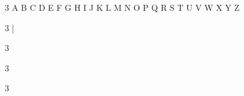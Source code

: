 \documentclass[12pt,twoside]{article}
\begin{document}

\begin{multicols}{3}
\charexample A
\charexample B
\charexample C
\charexample D
\charexample E
\charexample F
\charexample G
\charexample H
\charexample I
\charexample J
\charexample K
\charexample L
\charexample M
\charexample N
\charexample O
\charexample P
\charexample Q
\charexample R
\charexample S
\charexample T
\charexample U
\charexample V
\charexample W
\charexample X
\charexample Y
\charexample Z
\end{multicols}


\begin{multicols}{3}
\accentexample\acute
\accentexample\aacute
\accentexample\dot
\accentexample\ddot
\accentexample\grave
\accentexample\breve
\accentexample\hat
\accentexample\check
\accentexample\bar
\accentexample\mathring
\accentexample\tilde
\end{multicols}


\begin{multicols}{3}
\end{multicols}


\begin{multicols}{3}
\charexample\Alpha
\charexample\Beta
\charexample\Gamma
\charexample\Delta
\charexample\Epsilon
\charexample\Zeta
\charexample\Eta
\charexample\Theta
\charexample\Iota
\charexample\Kappa
\charexample\Lambda
\charexample\Mu
\charexample\Nu
\charexample\Xi
\charexample\Omicron
\charexample\Pi
\charexample\Rho
\charexample\Sigma
\charexample\Tau
\charexample\Upsilon
\charexample\Phi
\charexample\Chi
\charexample\Psi
\charexample\Omega
\charexample\varTheta
\charexample\increment
\charexample\nabla
\end{multicols}


\begin{multicols}{3}
\charexample\alpha
\charexample\beta
\charexample\gamma
\charexample\delta
\charexample\epsilon
\charexample\zeta
\charexample\eta
\charexample\theta
\charexample\iota
\charexample\kappa
\charexample\lambda
\charexample\mu
\charexample\nu
\charexample\xi
\charexample\omicron
\charexample\pi
\charexample\rho
\charexample\sigma
\charexample\tau
\charexample\upsilon
\charexample\phi
\charexample\chi
\charexample\psi
\charexample\omega
\charexample\varbeta
\charexample\varepsilon
\charexample\varkappa
\charexample\vartheta
\charexample\varrho
\charexample\varsigma
\charexample\varphi
\end{multicols}
\end{document}

